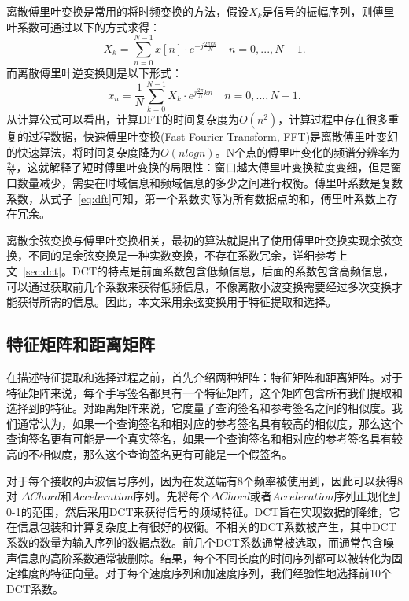 离散傅里叶变换是常用的将时频变换的方法，假设$X_{k}$是信号的振幅序列，则傅里叶系数可通过以下的方式求得：
\begin{equation}
X_{k} = \sum_{n=0}^{N-1}x[n] \cdot e^{-j\frac{2\pi kn}{N}} \quad n=0,...,N-1.  \label{eq:dft}
\end{equation}
而离散傅里叶逆变换则是以下形式：
\begin{equation}
 x_{n} = \frac{1}{N}\sum_{k=0}^{N-1}X_{k} \cdot e^{j\frac{2\pi}{N}kn} \quad n=0,...,N-1. \label{eq:idft}
\end{equation}
从计算公式可以看出，计算DFT的时间复杂度为$O(n^{2})$，计算过程中存在很多重复的过程数据，快速傅里叶变换(Fast Fourier Transform, FFT)是离散傅里叶变幻的快速算法，将时间复杂度降为$O(nlog n)$。N个点的傅里叶变化的频谱分辨率为$\frac{2\pi}{N}$，这就解释了短时傅里叶变换的局限性：窗口越大傅里叶变换粒度变细，但是窗口数量减少，需要在时域信息和频域信息的多少之间进行权衡。傅里叶系数是复数系数，从式子~\ref{eq:dft}可知，第一个系数实际为所有数据点的和，傅里叶系数上存在冗余。

离散余弦变换与傅里叶变换相关，最初的算法就提出了使用傅里叶变换实现余弦变换，不同的是余弦变换是一种实数变换，不存在系数冗余，详细参考上文~\ref{sec:dct}。DCT的特点是前面系数包含低频信息，后面的系数包含高频信息，可以通过获取前几个系数来获得低频信息，不像离散小波变换需要经过多次变换才能获得所需的信息。因此，本文采用余弦变换用于特征提取和选择。

\subsection{特征矩阵和距离矩阵}
在描述特征提取和选择过程之前，首先介绍两种矩阵：特征矩阵和距离矩阵。对于特征矩阵来说，每个手写签名都具有一个特征矩阵，这个矩阵包含所有我们提取和选择到的特征。对距离矩阵来说，它度量了查询签名和参考签名之间的相似度。我们通常认为，如果一个查询签名和相对应的参考签名具有较高的相似度，那么这个查询签名更有可能是一个真实签名，如果一个查询签名和相对应的参考签名具有较高的不相似度，那么这个查询签名更有可能是一个假签名。

对于每个接收的声波信号序列，因为在发送端有8个频率被使用到，因此可以获得8对 $\Delta Chord$和$Acceleration$序列。先将每个$\Delta Chord$或者$Acceleration$序列正规化到0-1的范围，然后采用DCT来获得信号的频域特征。DCT旨在实现数据的降维，它在信息包装和计算复杂度上有很好的权衡。不相关的DCT系数被产生，其中DCT系数的数量为输入序列的数据点数。前几个DCT系数通常被选取，而通常包含噪声信息的高阶系数通常被删除。结果，每个不同长度的时间序列都可以被转化为固定维度的特征向量。对于每个速度序列和加速度序列，我们经验性地选择前10个DCT系数。

